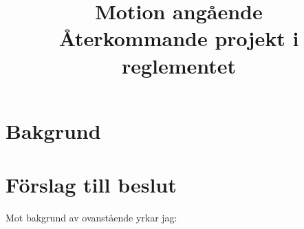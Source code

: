 \documentclass[a4paper]{article}
\title{\textcolor{cerise}{\textbf{
    Motion angående\\
    Återkommande projekt i reglementet
}}}
\date{}
\begin{document}
\maketitle
\thispagestyle{fancy} %

\section*{\textcolor{cerise}{
    Bakgrund
}}


\section*{\textcolor{cerise}{
    Förslag till beslut
}}

	Mot bakgrund av ovanstående yrkar jag:
\end{document}
